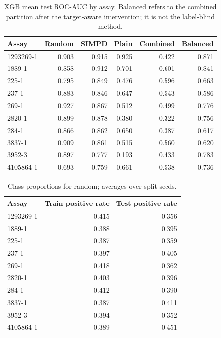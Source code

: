 \begin{table}[htbp]\centering\small
\begin{tabular}{lrrrrr}
\toprule
Assay & Random & SIMPD & Plain & Combined & Balanced \\
\midrule
1293269-1 & 0.903 & 0.915 & 0.925 & 0.422 & 0.871 \\
1889-1 & 0.858 & 0.912 & 0.701 & 0.601 & 0.841 \\
225-1 & 0.795 & 0.849 & 0.476 & 0.596 & 0.663 \\
237-1 & 0.883 & 0.846 & 0.647 & 0.543 & 0.586 \\
269-1 & 0.927 & 0.867 & 0.512 & 0.499 & 0.776 \\
2820-1 & 0.899 & 0.878 & 0.380 & 0.322 & 0.756 \\
284-1 & 0.866 & 0.862 & 0.650 & 0.387 & 0.617 \\
3837-1 & 0.909 & 0.861 & 0.515 & 0.560 & 0.620 \\
3952-3 & 0.897 & 0.777 & 0.193 & 0.433 & 0.783 \\
4105864-1 & 0.693 & 0.759 & 0.661 & 0.538 & 0.736 \\
\bottomrule
\end{tabular}

\caption{XGB mean test ROC-AUC by assay. Balanced refers to the combined partition after the target-aware intervention; it is not the label-blind method.}\end{table}
\begin{table}[htbp]\centering\small
\begin{tabular}{lrr}
\toprule
Assay & Train positive rate & Test positive rate \\
\midrule
1293269-1 & 0.415 & 0.356 \\
1889-1 & 0.388 & 0.395 \\
225-1 & 0.387 & 0.359 \\
237-1 & 0.397 & 0.405 \\
269-1 & 0.418 & 0.362 \\
2820-1 & 0.403 & 0.396 \\
284-1 & 0.412 & 0.390 \\
3837-1 & 0.387 & 0.411 \\
3952-3 & 0.394 & 0.352 \\
4105864-1 & 0.389 & 0.451 \\
\bottomrule
\end{tabular}

\caption{Class proportions for random; averages over split seeds.}\end{table}
